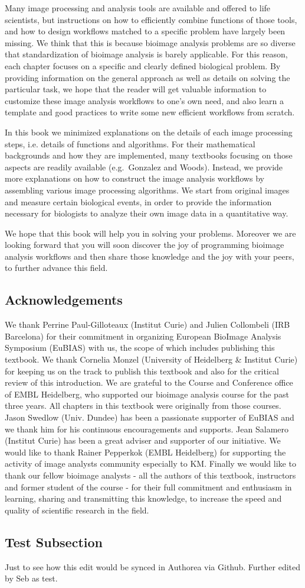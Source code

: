 Many image processing and analysis tools are available and offered to
life scientists, but instructions on how to efficiently combine functions of those tools, 
and how to design workflows matched to a specific problem have largely been missing. 
We think that this is because bioimage analysis problems are so diverse that
standardization of bioimage analysis is barely applicable. For this
reason, each chapter focuses on a specific and clearly defined biological
problem. By providing information on the general approach as well as details on solving the particular task, we hope that the reader will get valuable information to customize these image analysis workflows to one's own need, and also learn a template and good practices to  write some new efficient workflows from scratch.

In this book we minimized explanations on the details of each
image processing steps, i.e. details of functions and algorithms. For their mathematical backgrounds and how they
are implemented, many textbooks focusing on those aspects are readily available (e.g.~Gonzalez and Woods). Instead, we provide more explanations on how to construct the image analysis workflows by
assembling various image processing algorithms. We start from original
images and measure certain biological events, in order to provide the 
information necessary for biologists to analyze their own image data in a quantitative way.

We hope that this book will help you in solving your problems. Moreover we are looking forward that you will soon discover the joy of programming bioimage analysis workflows and then share those knowledge and the joy with your peers, to further advance this field.

\subsection{Acknowledgements}\label{acknowledgements}

We thank Perrine Paul-Gilloteaux (Institut Curie) and Julien Collombeli (IRB Barcelona) for their commitment in organizing European BioImage Analysis Symposium (EuBIAS) with us, the scope of which includes publishing this textbook. We thank Cornelia Monzel (University of Heidelberg \& Institut Curie) for keeping us on the track to publish this textbook and also for the critical review of this introduction. We are grateful to the Course and Conference office of EMBL Heidelberg, who supported our bioimage analysis course for the past three years. All chapters in this textbook were originally from those courses. Jason Swedlow (Univ. Dundee) has been a passionate supporter of EuBIAS and we thank him for his continuous encouragements and supports. Jean Salamero (Institut Curie) has been a great adviser and supporter of our initiative. We would like to thank Rainer Pepperkok (EMBL Heidelberg) for supporting the activity of image analysts community especially to KM.  Finally we would like to thank our fellow bioimage analysts - all the authors of this textbook, instructors and former student of the course - for their full commitment and enthusiasm in learning, sharing and  transmitting this knowledge, to increase the speed and quality of scientific research in the field.

\subsection{Test Subsection}

Just to see how this edit would be synced in Authorea via Github. Further edited by Seb as test.
